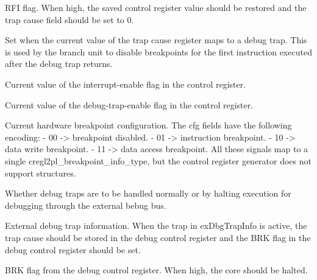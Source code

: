 \ifaceSubGroup{}
RFI flag. When high, the saved control register value should be restored and the 
trap cause field should be set to 0.

\ifaceSubGroup{}
Set when the current value of the trap cause register maps to a debug trap. This 
is used by the branch unit to disable breakpoints for the first instruction 
executed after the debug trap returns.

\ifaceSubGroup{}
Current value of the interrupt-enable flag in the control register.

\ifaceSubGroup{}
Current value of the debug-trap-enable flag in the control register.

\ifaceSubGroup{}
Current hardware breakpoint configuration. The cfg fields have the following
encoding:
 - 00 -> breakpoint disabled.
 - 01 -> instruction breakpoint.
 - 10 -> data write breakpoint.
 - 11 -> data access breakpoint.
All these signals map to a single cregl2pl_breakpoint_info_type, but the
control register generator does not support structures.

\ifaceSubGroup{}
Whether debug traps are to be handled normally or by halting execution for 
debugging through the external bebug bus.

\ifaceSubGroup{}
External debug trap information. When the trap in exDbgTrapInfo is active, the 
trap cause should be stored in the debug control register and the BRK flag in 
the debug control register should be set.

\ifaceSubGroup{}
BRK flag from the debug control register. When high, the core should be halted.


